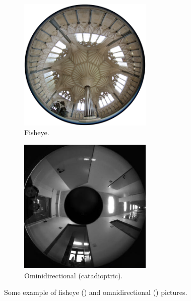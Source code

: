 \begin{figure}
	\centering
	\begin{subfigure}{0.4\textwidth}
		\centering
		\includegraphics[width=0.7\textwidth]{img/fisheye_example}
		\caption{Fisheye.}\label{fig:fisheye_example}
	\end{subfigure}
	\begin{subfigure}{0.4\textwidth}
		\centering
		\includegraphics[width=0.7\textwidth]{img/omnidirectional_example}
		\caption{Ominidirectional (catadioptric).}\label{fig:omnidirectional_example}
	\end{subfigure}
	\caption{Some example of fisheye () and omnidirectional () pictures.}\label{fig:wide_fov_pics}
\end{figure}

